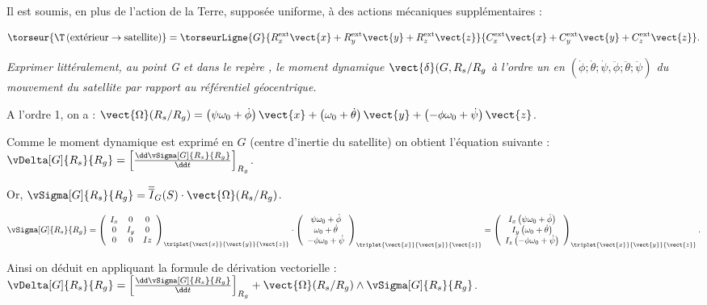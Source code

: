 Il est soumis, en plus de l'action de la Terre, supposée uniforme, à des
actions mécaniques supplémentaires :

$$
\torseur{\T\left(\text{extérieur}\to \text{satellite}\right)}=\torseurLigne{G}{R_x^{\text{ext}}\vect{x}+R_y^{\text{ext}}\vect{y}+R_z^{\text{ext}}\vect{z}}{C_x^{\text{ext}}\vect{x}+C_y^{\text{ext}}\vect{y}+C_z^{\text{ext}}\vect{z}}.
$$

\fi


\question{\label{q_7}}\textit{Exprimer littéralement, au point G et dans le repère , le moment dynamique $\vect{\delta}(G,R_s/R_g$ à l'ordre un en $\left(\dot{\phi};\dot{\theta};\dot{\psi},\ddot{\phi};\ddot{\theta};\ddot{\psi}\right)$ du mouvement du satellite par rapport au référentiel géocentrique.}
\ifprof
\begin{corrige}

A l'ordre 1, on a : $
\vect{\Omega}(R_s/R_g)=\left(\psi\omega_0+\dot{\phi}\right)\vect{x}+\left(\omega_0+\dot{\theta}\right)\vect{y}+\left(-\phi\omega_0+\dot{\psi}\right)\vect{z}
$.

Comme le moment dynamique est exprimé en $G$ (centre d'inertie du satellite) on obtient l'équation suivante : 
$
\vDelta[G]{R_s}{R_g}=\left[\frac{\dd \vSigma[G]{R_s}{R_g}}{\dd t}\right]_{R_g}
$.


Or, $\vSigma[G]{R_s}{R_g}=\overline{\overline{I}}_G(S)\cdot \vect{\Omega}(R_s/R_g)$.

$$
\vSigma[G]{R_s}{R_g}=\left(
\begin{array}{ccc}
I_x & 0 & 0 \\ 
0 & I_y & 0 \\ 
0 & 0 & Iz
\end{array}
\right)_{\triplet{\vect{x}}{\vect{y}}{\vect{z}}} 
\cdot 
\left(
\begin{array}{c}
\psi\omega_0+\dot{\phi} \\ 
\omega_0+\dot{\theta} \\ 
-\phi\omega_0+\dot{\psi}
\end{array}
\right)_{\triplet{\vect{x}}{\vect{y}}{\vect{z}}} 
=
\left(
\begin{array}{c}
I_x\left(\psi\omega_0+\dot{\phi} \right)\\ 
I_y\left(\omega_0+\dot{\theta} \right)\\ 
I_z\left(-\phi\omega_0+\dot{\psi}\right)
\end{array}
\right)_{\triplet{\vect{x}}{\vect{y}}{\vect{z}}} .
$$

Ainsi on déduit en appliquant la formule de dérivation vectorielle : $
\vDelta[G]{R_s}{R_g}=\left[\frac{\dd \vSigma[G]{R_s}{R_g}}{\dd t}\right]_{R_g}+\vect{\Omega}(R_s/R_g)\wedge  \vSigma[G]{R_s}{R_g}$. 


\end{corrige}
